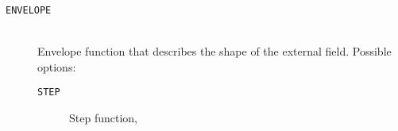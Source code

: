 \documentclass[12pt]{article}
\begin{document}
\begin{description}
      \item[\texttt{ENVELOPE}] \hfill \\ 
        Envelope function that describes the shape of the external field. Possible options:
        \begin{description}
% 
          \item[\texttt{STEP}] Step function,

\end{description}
\end{description}
\end{document}
